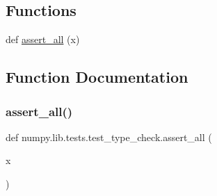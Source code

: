 \subsection*{Functions}
\begin{DoxyCompactItemize}
\item 
def \hyperlink{namespacenumpy_1_1lib_1_1tests_1_1test__type__check_adefb7ee9012305f5fc6967f3b8ef0b88}{assert\+\_\+all} (x)
\end{DoxyCompactItemize}


\subsection{Function Documentation}
\mbox{\label{namespacenumpy_1_1lib_1_1tests_1_1test__type__check_adefb7ee9012305f5fc6967f3b8ef0b88}} 
\subsubsection{\texorpdfstring{assert\+\_\+all()}{assert\_all()}}
{\footnotesize\ttfamily def numpy.\+lib.\+tests.\+test\+\_\+type\+\_\+check.\+assert\+\_\+all (\begin{DoxyParamCaption}\item[{}]{x }\end{DoxyParamCaption})}


